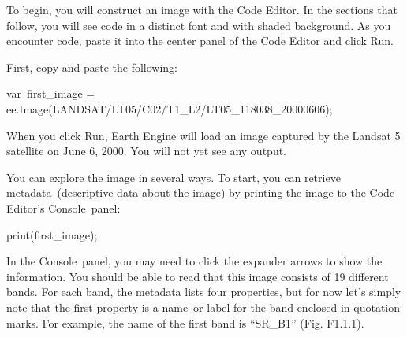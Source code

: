 \documentclass[
  letterpaper,
  DIV=11,
  numbers=noendperiod]{scrreprt}
\newenvironment{Shaded}{\begin{snugshade}}{\end{snugshade}}
\newcommand{\FunctionTok}[1]{\textcolor[rgb]{0.28,0.35,0.67}{#1}}
\newcommand{\NormalTok}[1]{\textcolor[rgb]{0.00,0.23,0.31}{#1}}
\newcommand{\OperatorTok}[1]{\textcolor[rgb]{0.37,0.37,0.37}{#1}}
\newcommand{\StringTok}[1]{\textcolor[rgb]{0.13,0.47,0.30}{#1}}
\begin{document}
To begin, you will construct an image with the Code Editor. In the
sections that follow, you will see code in a distinct font and with
shaded background. As you encounter code, paste it into the center panel
of the Code Editor and click Run.

First, copy and paste the following:

\begin{Shaded}
\begin{Highlighting}[]
\NormalTok{var first\_image }\OperatorTok{=}\NormalTok{ ee}\OperatorTok{.}\FunctionTok{Image}\NormalTok{(}\StringTok{\textquotesingle{}LANDSAT/LT05/C02/T1\_L2/LT05\_118038\_20000606\textquotesingle{}}\NormalTok{)}\OperatorTok{;}
\end{Highlighting}
\end{Shaded}

When you click Run, Earth Engine will load an image captured by the
Landsat 5 satellite on June 6, 2000. You will not yet see any output.

You can explore the image in several ways. To start, you can retrieve
metadata~(descriptive data about the image) by printing the image to the
Code Editor's Console~panel:

\begin{Shaded}
\begin{Highlighting}[]
\FunctionTok{print}\NormalTok{(first\_image)}\OperatorTok{;}
\end{Highlighting}
\end{Shaded}

In the Console~panel, you may need to click the expander arrows to show
the information. You should be able to read that this image consists of
19 different bands. For each band, the metadata lists four properties,
but for now let's simply note that the first property is a name~or label
for the band enclosed in quotation marks. For example, the name of the
first band is ``SR\_B1'' (Fig. F1.1.1).
\end{document}
